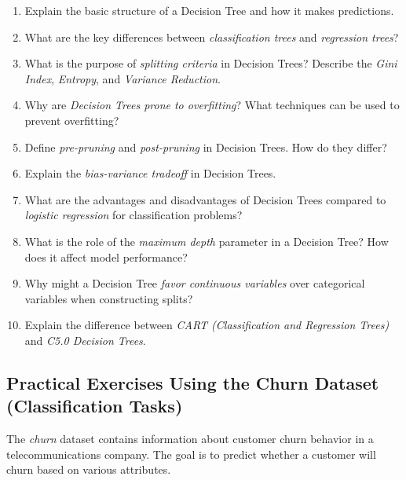 \documentclass[
  11pt,
]{book}
\providecommand{\tightlist}{%
  \setlength{\itemsep}{0pt}\setlength{\parskip}{0pt}}
\theoremstyle{definition}
\theoremstyle{definition}
\theoremstyle{definition}
\theoremstyle{definition}
\theoremstyle{remark}
\begin{document}
\begin{enumerate}
\def\labelenumi{\arabic{enumi}.}
\tightlist
\item
  Explain the basic structure of a Decision Tree and how it makes predictions.\\
\item
  What are the key differences between \emph{classification trees} and \emph{regression trees}?\\
\item
  What is the purpose of \emph{splitting criteria} in Decision Trees? Describe the \emph{Gini Index}, \emph{Entropy}, and \emph{Variance Reduction}.\\
\item
  Why are \emph{Decision Trees prone to overfitting}? What techniques can be used to prevent overfitting?\\
\item
  Define \emph{pre-pruning} and \emph{post-pruning} in Decision Trees. How do they differ?\\
\item
  Explain the \emph{bias-variance tradeoff} in Decision Trees.\\
\item
  What are the advantages and disadvantages of Decision Trees compared to \emph{logistic regression} for classification problems?\\
\item
  What is the role of the \emph{maximum depth} parameter in a Decision Tree? How does it affect model performance?\\
\item
  Why might a Decision Tree \emph{favor continuous variables} over categorical variables when constructing splits?\\
\item
  Explain the difference between \emph{CART (Classification and Regression Trees)} and \emph{C5.0 Decision Trees}.
\end{enumerate}

\subsection*{Practical Exercises Using the Churn Dataset (Classification Tasks)}\label{practical-exercises-using-the-churn-dataset-classification-tasks}


The \emph{churn} dataset contains information about customer churn behavior in a telecommunications company. The goal is to predict whether a customer will churn based on various attributes.
\end{document}
